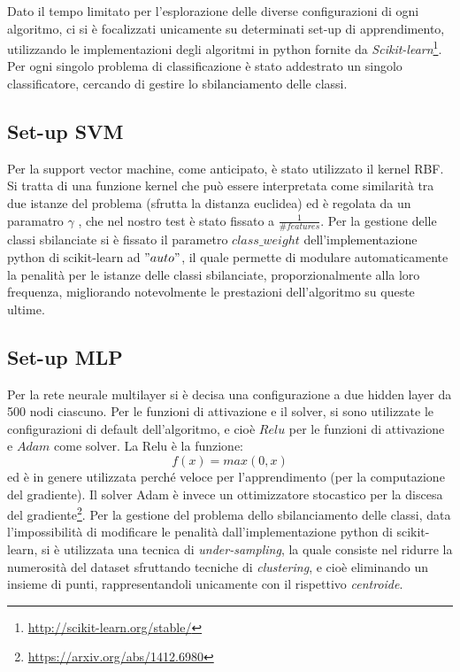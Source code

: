 \documentclass{article}
\begin{document}
Dato il tempo limitato per l'esplorazione delle diverse configurazioni di ogni algoritmo, ci si è focalizzati unicamente su determinati set-up di apprendimento, utilizzando le implementazioni degli algoritmi in python fornite da \textit{Scikit-learn}\footnote{\url{http://scikit-learn.org/stable/}}.
\newline
\newline
Per ogni singolo problema di classificazione è stato addestrato un singolo classificatore, cercando di gestire lo sbilanciamento delle classi.

\subsection{Set-up SVM}
Per la support vector machine, come anticipato, è stato utilizzato il kernel RBF. Si tratta di una funzione kernel che può essere interpretata come similarità tra due istanze del problema (sfrutta la distanza euclidea) ed è regolata da un paramatro $\gamma$ , che nel nostro test è stato fissato a $\frac{1}{\#features}$.
\newline
\newline
Per la gestione delle classi sbilanciate si è fissato il parametro $class\_weight$ dell'implementazione python di scikit-learn ad $"auto"$, il quale permette di modulare automaticamente la penalità per le istanze delle classi sbilanciate, proporzionalmente alla loro frequenza, migliorando notevolmente le prestazioni dell'algoritmo su queste ultime.

\subsection{Set-up MLP}
Per la rete neurale multilayer si è decisa una configurazione a due hidden layer da 500 nodi ciascuno.
\newline
\newline
Per le funzioni di attivazione e il solver, si sono utilizzate le configurazioni di default dell'algoritmo, e cioè $Relu$ per le funzioni di attivazione e $Adam$ come solver.
\newline
\newline
La Relu è la funzione:
\[
 f(x) = max(0, x)
 \]
ed è in genere utilizzata perché veloce per l'apprendimento (per la computazione del gradiente).
\newline
\newline
Il solver Adam è invece un ottimizzatore stocastico per la discesa del gradiente\footnote{\url{https://arxiv.org/abs/1412.6980}}.
\newline
\newline
Per la gestione del problema dello sbilanciamento delle classi, data l'impossibilità di modificare le penalità dall'implementazione python di scikit-learn, si è utilizzata una tecnica di \textit{under-sampling}, la quale consiste nel ridurre la numerosità del dataset sfruttando tecniche di \textit{clustering}, e cioè eliminando un insieme di punti, rappresentandoli unicamente con il rispettivo \textit{centroide}.
\end{document}
